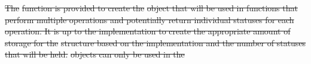 \documentclass[12pt]{report} %
\providecommand{\DIFdeltex}[1]{{\protect\color{red}\sout{#1}}}                      %
\providecommand{\DIFdelend}{} %
\providecommand{\DIFdel}[1]{\texorpdfstring{\DIFdeltex{#1}}{}} %
\DeclareRobustCommand{\DIFdelend}{\DIFOaddend \let\includegraphics\DIFOincludegraphics} %
\begin{document}

\DIFdel{The }%
\DIFdel{function is provided to create the }%
\DIFdel{object that will be used in functions that perform multiple operations and potentially return individual statuses for each operation. 
It is up to the implementation to create the appropriate amount of storage for the }%
\DIFdel{structure based on the implementation and the number of statuses that will be held.
}%
\DIFdel{objects can only be used in the }\DIFdelend %
\end{document}
